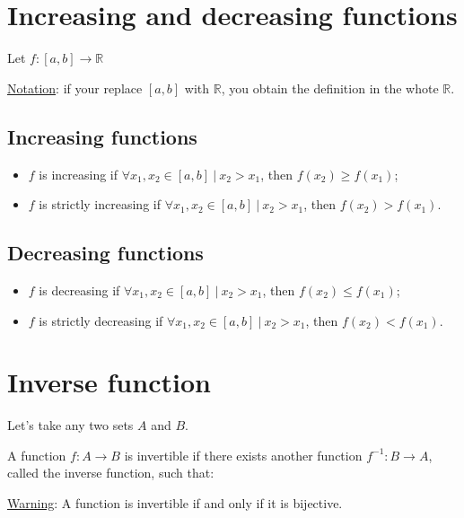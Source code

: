 \documentclass{article}
\newcommand{\figbox}[1]{ 
    \begin{figure*}[ht!]        
        \begin{center}            
            \fbox{#1}        
        \end{center}    
    \end{figure*}
}
\newcommand{\nots}{\underline{Notation}: }
\newcommand{\wrn}{\underline{Warning}: }
\newcommand{\sht}{\ |\ }
\begin{document}
\newpage
\section{Increasing and decreasing functions}
Let $f:[a,b] \longrightarrow \mathbb{R}$

\nots{if your replace $[a,b]$ with $\mathbb{R}$, you obtain the definition in the whote $\mathbb{R}$.}

\subsection{Increasing functions}
\begin{itemize}
    \item $f$ is increasing if $\forall x_1,x_2 \in [a,b] \sht x_2>x_1$, then $f(x_2)\geq f(x_1)$;
    \item $f$ is strictly increasing if $\forall x_1,x_2 \in [a,b] \sht x_2>x_1$, then $f(x_2)>f(x_1)$.
\end{itemize}

\subsection{Decreasing functions}
\begin{itemize}
    \item $f$ is decreasing if $\forall x_1,x_2 \in [a,b] \sht x_2>x_1$, then $f(x_2)\leq f(x_1)$;
    \item $f$ is strictly decreasing if $\forall x_1,x_2 \in [a,b] \sht x_2>x_1$, then $f(x_2)<f(x_1)$.
\end{itemize}

\section{Inverse function}
Let's take any two sets $A$ and $B$.

A function $f: A \rightarrow B$ is invertible if there exists another
function $f^{-1}: B \rightarrow A$, called the inverse function, such that:

\figbox{\begin{minipage}{3.6cm}
    $\forall x \in A,\ f^{-1}(f(x)) = x$ \vspace*{-.25cm}\\
    $\forall y \in B,\ f(f^{-1}(y)) = y$
\end{minipage}}

\wrn{A function is invertible if and only if it is bijective.}
\end{document}
